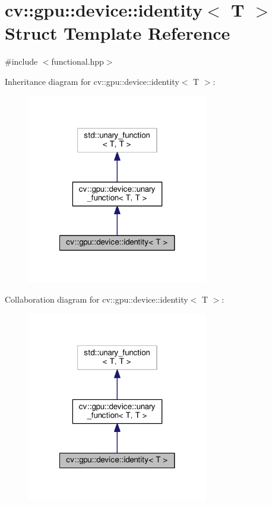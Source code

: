 \hypertarget{structcv_1_1gpu_1_1device_1_1identity}{\section{cv\-:\-:gpu\-:\-:device\-:\-:identity$<$ T $>$ Struct Template Reference}
\label{structcv_1_1gpu_1_1device_1_1identity}
}


{\ttfamily \#include $<$functional.\-hpp$>$}



Inheritance diagram for cv\-:\-:gpu\-:\-:device\-:\-:identity$<$ T $>$\-:\nopagebreak
\begin{figure}[H]
\begin{center}
\leavevmode
\includegraphics[width=224pt]{structcv_1_1gpu_1_1device_1_1identity__inherit__graph}
\end{center}
\end{figure}


Collaboration diagram for cv\-:\-:gpu\-:\-:device\-:\-:identity$<$ T $>$\-:\nopagebreak
\begin{figure}[H]
\begin{center}
\leavevmode
\includegraphics[width=224pt]{structcv_1_1gpu_1_1device_1_1identity__coll__graph}
\end{center}
\end{figure}
